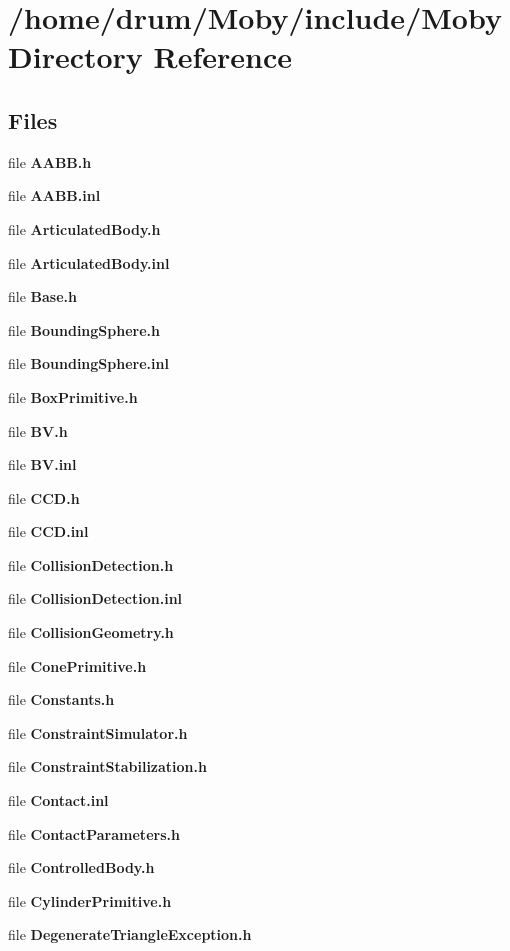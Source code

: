 \section{/home/drum/\-Moby/include/\-Moby Directory Reference}
\label{dir_8dccde026d241e70547d166bdc6757f6}
\subsection*{Files}
\begin{DoxyCompactItemize}
\item 
file {\bfseries A\-A\-B\-B.\-h}
\item 
file {\bfseries A\-A\-B\-B.\-inl}
\item 
file {\bfseries Articulated\-Body.\-h}
\item 
file {\bfseries Articulated\-Body.\-inl}
\item 
file {\bfseries Base.\-h}
\item 
file {\bfseries Bounding\-Sphere.\-h}
\item 
file {\bfseries Bounding\-Sphere.\-inl}
\item 
file {\bfseries Box\-Primitive.\-h}
\item 
file {\bfseries B\-V.\-h}
\item 
file {\bfseries B\-V.\-inl}
\item 
file {\bfseries C\-C\-D.\-h}
\item 
file {\bfseries C\-C\-D.\-inl}
\item 
file {\bfseries Collision\-Detection.\-h}
\item 
file {\bfseries Collision\-Detection.\-inl}
\item 
file {\bfseries Collision\-Geometry.\-h}
\item 
file {\bfseries Cone\-Primitive.\-h}
\item 
file {\bfseries Constants.\-h}
\item 
file {\bfseries Constraint\-Simulator.\-h}
\item 
file {\bfseries Constraint\-Stabilization.\-h}
\item 
file {\bfseries Contact.\-inl}
\item 
file {\bfseries Contact\-Parameters.\-h}
\item 
file {\bfseries Controlled\-Body.\-h}
\item 
file {\bfseries Cylinder\-Primitive.\-h}
\item 
file {\bfseries Degenerate\-Triangle\-Exception.\-h}

\end{DoxyCompactItemize}
